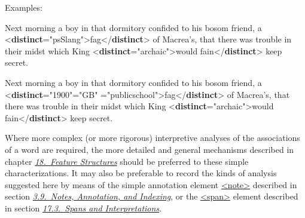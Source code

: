 Examples: \par\bgroup{}\exampleFont \begin{shaded}\noindent\mbox{}Next morning a boy in that dormitory confided to his\mbox{}\newline 
 bosom friend, a {<\textbf{distinct}\hspace*{1em}{type}="{psSlang}">}fag{</\textbf{distinct}>} of\mbox{}\newline 
 Macrea's, that there was trouble in their midst which\mbox{}\newline 
 King {<\textbf{distinct}\hspace*{1em}{type}="{archaic}">}would fain{</\textbf{distinct}>} keep\mbox{}\newline 
 secret.\end{shaded}\egroup\par \noindent  \par\bgroup{}\exampleFont \begin{shaded}\noindent\mbox{}Next morning a boy in that dormitory confided to his\mbox{}\newline 
 bosom friend, a\mbox{}\newline 
{<\textbf{distinct}\hspace*{1em}{time}="{1900}"\hspace*{1em}{space}="{GB}"\mbox{}\newline 
\hspace*{1em}{social}="{publicschool}">}fag{</\textbf{distinct}>}\mbox{}\newline 
 of Macrea's, that there was trouble in their midst which\mbox{}\newline 
 King {<\textbf{distinct}\hspace*{1em}{time}="{archaic}">}would fain{</\textbf{distinct}>} keep\mbox{}\newline 
 secret.\end{shaded}\egroup\par \noindent  Where more complex (or more rigorous) interpretive analyses of the associations of a word are required, the more detailed and general mechanisms described in chapter \textit{\hyperref[FS]{18.\ Feature Structures}} should be preferred to these simple characterizations. It may also be preferable to record the kinds of analysis suggested here by means of the simple annotation element \hyperref[TEI.note]{<note>} described in section \textit{\hyperref[CONO]{3.9.\ Notes, Annotation, and Indexing}}, or the \hyperref[TEI.span]{<span>} element described in section \textit{\hyperref[AISP]{17.3.\ Spans and Interpretations}}.
